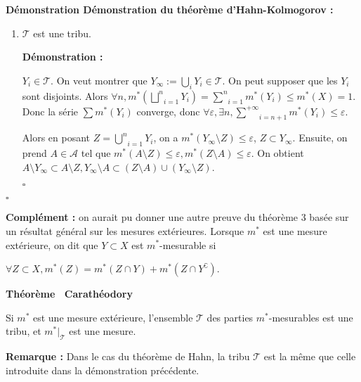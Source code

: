\documentclass[10pt,a4paper,notitlepage ]{report}
\newcommand{\comp}[1]{#1^\complement}
\newcounter{th}
\newenvironment{theorem}[1][]{
\refstepcounter{th}
\begin{tcolorbox}
	\textbf{Théorème \theth \ #1}
	
	
}{\end{tcolorbox}}
\newenvironment{demo}[1][]{

	\textbf{Démonstration #1 :}
}{\begin{flushright}
	$\square$
\end{flushright}
}
\newenvironment{rem}{
	
	\textbf{Remarque :}}{}
\begin{document}
\begin{demo}[Démonstration du théorème d'Hahn-Kolmogorov]
\begin{enumerate}
\begin{demo}
			Finalement, $m^*(Y) + m^*(Z) \le m^*(Y \cup Z) + 6\varepsilon$ 
		\end{demo}
	Comme $m^*$ est une mesure extérieure et une mesure additive sur l'algèbre $\mathcal T$, elle a la propriété de $\sigma$-additivité.
	\item $\mathcal T$ est une tribu.
	\begin{demo}
		$Y_i \in \mathcal T$. On veut montrer que $Y_\infty := \underset i \bigcup Y_i \in \mathcal T$. On peut supposer que les $Y_i$ sont disjoints. Alors $\forall n, m^*(\underset{i = 1}{\overset{n} \bigsqcup} Y_i) = \underset{i = 1}{\overset{n} \sum} m^*(Y_i) \le m^*(X) = 1$. Donc la série $\sum m^*(Y_i)$ converge, donc $\forall \varepsilon, \exists n, \underset{i = n+1}{\overset{+\infty} \sum} m^*(Y_i) \le \varepsilon$.
					
		Alors en posant $Z= \underset{i = 1}{\overset{n} \bigcup} Y_i$, on a $m^*(Y_\infty \setminus Z) \le \varepsilon$, $Z \subset Y_\infty$. Ensuite, on prend $A \in \mathcal A$ tel que $m^*(A\setminus Z) \le \varepsilon, m^*(Z\setminus A) \le \varepsilon$. On obtient $A \setminus Y_\infty \subset A \setminus Z, Y_\infty \setminus A \subset (Z \setminus A) \cup (Y_\infty \setminus Z)$.
	\end{demo}
	\end{enumerate}
\end{demo}

\textbf{Complément :} on aurait pu donner une autre preuve du théorème 3 basée sur un résultat général sur les mesures extérieures. Lorsque $m^*$ est une mesure extérieure, on dit que $Y \subset X$ est $m^*$-mesurable si

$\forall Z \subset X, m^*(Z) = m^*(Z \cap Y) + m^*(Z \cap \comp Y)$.

\begin{theorem}[Carathéodory]
	Si $m^*$ est une mesure extérieure, l'ensemble $\mathcal T$ des parties $m^*$-mesurables est une tribu, et $m^*|_{\mathcal T}$ est une mesure.
\end{theorem}
\begin{rem}
	Dans le cas du théorème de Hahn, la tribu $\mathcal T$ est la même que celle introduite dans la démonstration précédente.
\end{rem}
\end{document}

